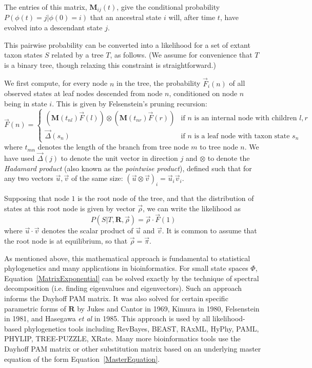 \documentclass{bmcart}
\newcommand{\matr}[1]{\mathbf{#1}}
\newcommand{\eqref}[1]{Equation~\ref{#1}}
\begin{document}
The entries of this matrix, $\matr{M}_{ij}(t)$, give the conditional probability
$P(\phi(t)=j|\phi(0)=i)$ that an ancestral state $i$ will, after time $t$, have evolved into a descendant state $j$.

This pairwise probability can be converted
into a likelihood for a set of extant taxon states $S$ related by a tree $T$,
as follows.
(We assume for convenience that $T$ is a binary tree, though relaxing this constraint is straightforward.)

We first compute, for every node $n$ in the tree,
the probability $\vec{F}_i(n)$
of all observed states at leaf nodes descended from node $n$,
conditioned on node $n$ being in state $i$.
This is given by Felsenstein's pruning recursion:
\begin{equation}
\vec{F}(n) = \left\{
\begin{array}{ll}
\displaystyle
\left( \matr{M}(t_{nl}) \vec{F}(l) \right)
\otimes
\left( \matr{M}(t_{nr}) \vec{F}(r) \right)
& \mbox{if $n$ is an internal node with children $l,r$} \\
\displaystyle
\vec{\Delta}(s_n)
& \mbox{if $n$ is a leaf node with taxon state $s_n$}
\end{array}
\right.
\label{Felsenstein}
\end{equation}
where $t_{mn}$ denotes the length of the branch from tree node $m$ to tree node $n$.
We have used
$\vec{\Delta}(j)$ to denote the unit vector in direction $j$
and
$\otimes$ to denote the {\em Hadamard product} (also known as the {\em pointwise product}),
defined such that for any two vectors $\vec{u},\vec{v}$ of the same size:
$(\vec{u} \otimes \vec{v})_i = \vec{u}_i \vec{v}_i$.

Supposing that node $1$ is the root node of the tree,
and that the distribution of states at this root node is given by vector $\vec{\rho}$,
we can write the likelihood as
\begin{equation}
P(S|T,\matr{R},\vec{\rho}) = \vec{\rho} \cdot \vec{F}(1)
\label{Likelihood}
\end{equation}
where $\vec{u} \cdot \vec{v}$ denotes the scalar product of $\vec{u}$ and $\vec{v}$.
It is common to assume that the root node is at equilibrium,
so that $\vec{\rho} = \vec{\pi}$.

As mentioned above, this mathematical approach is fundamental to statistical phylogenetics
and many applications in bioinformatics.
For small state spaces $\Phi$, \eqref{MatrixExponential} can be solved exactly
by the technique of spectral decomposition (i.e. finding eigenvalues and eigenvectors).
Such an approach informs the Dayhoff PAM matrix.
It was also solved for certain specific parametric forms of $\matr{R}$
by Jukes and Cantor in 1969, Kimura in 1980, Felsenstein in 1981, and Hasegawa {\em et al} in 1985.
This approach is used by all likelihood-based phylogenetics tools including
RevBayes, BEAST, RAxML, HyPhy, PAML, PHYLIP, TREE-PUZZLE, XRate.
Many more bioinformatics tools use the Dayhoff PAM matrix or other substitution matrix
based on an underlying master equation of the form \eqref{MasterEquation}.
\end{document}
